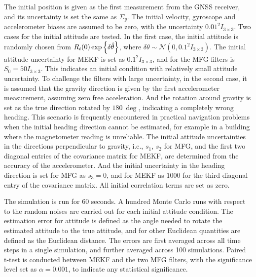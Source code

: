 The initial position is given as the first measurement from the GNSS receiver, and its uncertainty is set the same as $\Sigma_y$.
The initial velocity, gyroscope and accelerometer biases are assumed to be zero, with the uncertainty $0.01^2I_{3\times 3}$.
Two cases for the initial attitude are tested.
In the first case, the initial attitude is randomly chosen from $R_t(0)\exp\left\{ \delta\hat{\theta} \right\}$, where $\delta\theta\sim\mathcal{N}(0,0.1^2I_{3\times 3})$.
The initial attitude uncertainty for MEKF is set as $0.1^2I_{3\times 3}$, and for the MFG filters is $S_0 = 50I_{3\times 3}$.
This indicates an initial condition with relatively small attitude uncertainty.
To challenge the filters with large uncertainty, in the second case, it is assumed that the gravity direction is given by the first accelerometer measurement, assuming zero free acceleration.
And the rotation around gravity is set as the true direction rotated by $\SI{180}{\deg}$, indicating a completely wrong heading.
This scenario is frequently encountered in practical navigation problems when the initial heading direction cannot be estimated, for example in a building where the magnetometer reading is unreliable.
The initial attitude uncertainties in the directions perpendicular to gravity, i.e., $s_1$, $s_2$ for MFG, and the first two diagonal entries of the covariance matrix for MEKF, are determined from the accuracy of the accelerometer.
And the initial uncertainty in the heading direction is set for MFG as $s_3 = 0$, and for MEKF as $1000$ for the third diagonal entry of the covariance matrix.
All initial correlation terms are set as zero.

The simulation is run for 60 seconds.
A hundred Monte Carlo runs with respect to the random noises are carried out for each initial attitude condition.
The estimation error for attitude is defined as the angle needed to rotate the estimated attitude to the true attitude, and for other Euclidean quantities are defined as the Euclidean distance.
The errors are first averaged across all time steps in a single simulation, and further averaged across 100 simulations.
Paired t-test is conducted between MEKF and the two MFG filters, with the significance level set as $\alpha=0.001$, to indicate any statistical significance.

